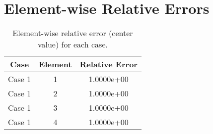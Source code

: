 \section{Element-wise Relative Errors}
\begin{table}[h!]
\centering
\begin{tabular}{|c|c|c|}
\hline
Case & Element & Relative Error \\
\hline
Case 1 & 1 & 1.0000e+00 \\
Case 1 & 2 & 1.0000e+00 \\
Case 1 & 3 & 1.0000e+00 \\
Case 1 & 4 & 1.0000e+00 \\
\hline
\end{tabular}
\caption{Element-wise relative error (center value) for each case.}
\end{table}